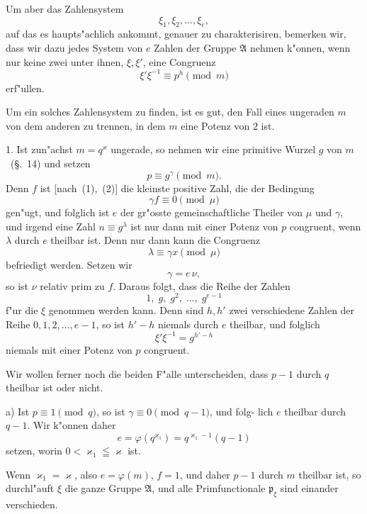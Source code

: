 \documentclass[12pt,a4paper]{article}
\theoremstyle{weber}
\begin{document}
Um aber das Zahlensystem
\begin{equation}\label{eq:s172-7}
\xi_1, \xi_2, \dots, \xi_e,
\end{equation}
auf das es haupts"achlich ankommt, genauer zu charakterisiren,
bemerken wir, dass wir dazu jedes System von $e$ Zahlen der
Gruppe $\mathfrak{A}$ nehmen k"onnen, wenn nur keine zwei unter ihnen,
$\xi, \xi'$, eine Congruenz
\[
\xi'\xi^{-1} \equiv p^h \pmod{m}
\]
erf"ullen.

Um ein solches Zahlensystem zu finden, ist es gut, den Fall
eines ungeraden $m$ von dem anderen zu trennen, in dem $m$ eine
Potenz von $2$ ist.

1. Ist zun"achst $m = q^\varkappa$ ungerade, so nehmen wir eine
primitive Wurzel $g$ von $m$~(\S.~14) und setzen
\begin{equation}\label{eq:s172-8}
p \equiv g^\gamma \pmod{m}.
\end{equation}
Denn $f$ ist [nach~(1),~(2)] die kleinste positive Zahl, die der
Bedingung
\[
\gamma f \equiv 0 \pmod{\mu}
\]
gen"ugt, und folglich ist $e$ der gr"osste gemeinschaftliche Theiler
von $\mu$ und $\gamma$, und irgend eine Zahl $n \equiv g^\lambda$ ist nur dann mit
einer Potenz von $p$ congruent, wenn $\lambda$ durch $e$ theilbar ist. Denn
nur dann kann die Congruenz
\[
\lambda \equiv \gamma x \pmod{\mu}
\]
befriedigt werden. Setzen wir
\[
\gamma = e\,\nu,
\]
so ist $\nu$ relativ prim zu $f$. Daraus folgt, dass die Reihe der Zahlen
\begin{equation}\label{eq:s172-9}
1,\; g,\; g^2,\; \dots,\; g^{e-1}
\end{equation}
f"ur die $\xi$ genommen werden kann. Denn sind $h, h'$ zwei verschiedene
Zahlen der Reihe $0, 1, 2, \dots, e-1$, so ist $h' - h$ niemals durch $e$
theilbar, und folglich
\[
\xi'\xi^{-1} = g^{h'-h}
\]
niemals mit einer Potenz von $p$ congruent.

Wir wollen ferner noch die beiden F"alle unterscheiden, dass
$p - 1$ durch $q$ theilbar ist oder nicht.

a) Ist $p \equiv 1 \pmod{q}$, so ist $\gamma \equiv 0 \pmod{q-1}$, und folg-
lich $e$ theilbar durch $q - 1$. Wir k"onnen daher
\[
e = \varphi(q^{\varkappa_1}) = q^{\varkappa_1-1}(q-1)
\]
setzen, worin $0 < \varkappa_1 \leqq \varkappa$ ist.

Wenn $\varkappa_1 = \varkappa$, also $e = \varphi(m)$, $f = 1$, und daher $p - 1$
durch $m$ theilbar ist, so durchl"auft $\xi$ die ganze Gruppe $\mathfrak{A}$, und
alle Primfunctionale $\mathfrak{p}_\xi$ sind einander verschieden.
\end{document}
